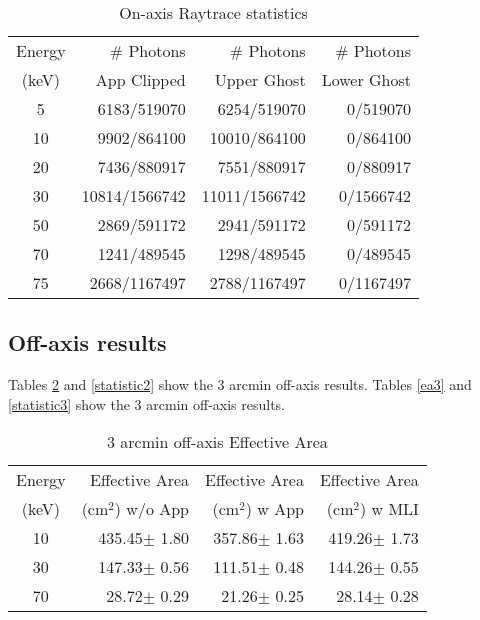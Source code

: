 \begin{table}[h]
\caption{On-axis Raytrace statistics}
\begin{center}
\begin{tabular}{|c|r|r|r|}
\hline
Energy & \# Photons & \# Photons &  \# Photons \\
(keV) &  App Clipped & Upper Ghost & Lower Ghost  \\
\hline
\hline
5 & 6183/519070 & 6254/519070 & 0/519070 \\
10 & 9902/864100 & 10010/864100 & 0/864100  \\
20 & 7436/880917 & 7551/880917 & 0/880917 \\
30 & 10814/1566742 & 11011/1566742 & 0/1566742  \\
50 & 2869/591172 & 2941/591172 & 0/591172 \\
70 & 1241/489545 & 1298/489545 & 0/489545 \\
75 & 2668/1167497 & 2788/1167497 & 0/1167497\\
\hline
\end{tabular}
\end{center}
\label{statistic1}
\end{table}

\subsection{Off-axis results}
Tables \ref{ea2} and \ref{statistic2} show the 3 arcmin off-axis results. Tables \ref{ea3} and \ref{statistic3} show the 3 arcmin off-axis results. 

\begin{table}[h]
\caption{3 arcmin off-axis Effective Area}
\begin{center}
\begin{tabular}{|c|r|r|r|}
\hline
Energy & Effective Area & Effective Area & Effective Area \\
(keV) & (cm$^2$) w/o App & (cm$^2$) w App &(cm$^2$) w MLI \\
\hline
\hline
10 & 435.45$\pm$ 1.80 & 357.86$\pm$ 1.63 & 419.26$\pm$ 1.73 \\
30 & 147.33$\pm$ 0.56 & 111.51$\pm$ 0.48 & 144.26$\pm$ 0.55 \\
70 &  28.72$\pm$ 0.29 & 21.26$\pm$ 0.25 & 28.14$\pm$ 0.28\\
\hline
\end{tabular}
\end{center}
\label{ea2}
\end{table}

